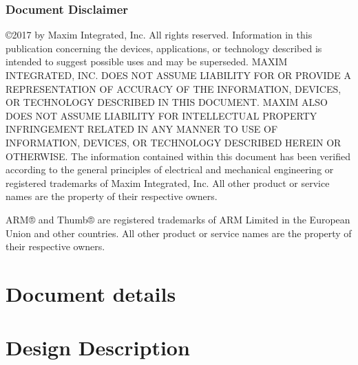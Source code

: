 \documentclass[twoside]{book}
\makeatletter
\newcommand\docyear{2017 }
\newcommand{\+}{\discretionary{\mbox{\scriptsize$\hookleftarrow$}}{}{}}
\renewcommand{\paragraph}{%
  \@startsection{paragraph}{4}{0ex}{-1.0ex}{1.0ex}{%
    \normalfont\normalsize\bfseries\SS@parafont%
  }%
}
\newcommand{\clearemptydoublepage}{%
  \newpage{\pagestyle{empty}\cleardoublepage}%
}
\let\cleardoublepage\clearpage
\let\oldchapter\chapter
\let\oldsection\section
\let\oldsubsection\subsection
\let\oldsubsubsection\subsubsection
\newcommand\mysection\oldsubsection
\newcommand\mysubsection\oldsubsubsection
\newcommand\mysubsubsection\paragraph
\newcommand\mysectionh\oldchapter
\newcommand\mysubsectionh\oldsection
\newcommand\mysubsubsectionh\oldsubsection
\newcommand\shiftleveldown{%
\makeatletter%
\renewcommand{\section}{\mysection}%
\renewcommand{\subsection}{\mysubsection}%
\renewcommand{\subsubsection}{\mysubsubsection}%
\makeatother%
}
\newcommand\restorelevel{%
\makeatletter%
\renewcommand{\section}{\oldsection}%
\renewcommand{\subsection}{\oldsubsection}%
\renewcommand{\subsubsection}{\oldsubsubsection}%
\makeatother%
}
\newcommand\shiftlevelup{%
\makeatletter%
\renewcommand{\section}{\mysectionh}%
\renewcommand{\subsection}{\mysubsectionh}%
\renewcommand{\subsubsection}{\mysubsubsectionh}%
\makeatother%
}
\makeatother
\begin{document}
\subsection*{Document Disclaimer}
©\docyear by Maxim Integrated, Inc. All rights reserved. Information in this publication concerning the devices, applications, or technology described is intended to suggest possible uses and may be superseded. MAXIM INTEGRATED, INC. DOES NOT ASSUME LIABILITY FOR OR PROVIDE A REPRESENTATION OF ACCURACY OF THE INFORMATION, DEVICES, OR TECHNOLOGY DESCRIBED IN THIS DOCUMENT. MAXIM ALSO DOES NOT ASSUME LIABILITY FOR INTELLECTUAL PROPERTY INFRINGEMENT RELATED IN ANY MANNER TO USE OF INFORMATION, DEVICES, OR TECHNOLOGY DESCRIBED HEREIN OR OTHERWISE. The information contained within this document has been verified according to the general principles of electrical and mechanical engineering or registered trademarks of Maxim Integrated, Inc. All other product or service names are the property of their respective owners. 

ARM® and Thumb® are registered trademarks of ARM Limited in the European Union and other countries. All other product or service names are the property of their respective owners.


\clearemptydoublepage
{}
\tableofcontents
\clearemptydoublepage
{}
\hypersetup{pageanchor=true}


\chapter{Document details}



\shiftlevelup
\label{index}\hypertarget{index}{}
\restorelevel

\chapter{Design Description}










\shiftleveldown





\restorelevel
\end{document}
